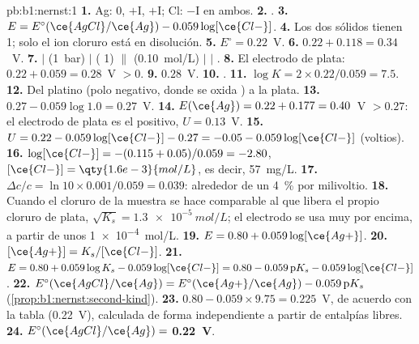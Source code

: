 \begin{solution}{pb:b1:nernst:1}
\textbf{1.} Ag: 0, $+$I, $+$I; Cl: $-$I en ambos.
\textbf{2.} .
\textbf{3.} $E = E^\circ(\ce{AgCl}/\ce{Ag}) - 0.059\log[\ce{Cl-}]$.
\textbf{4.} Los dos sólidos tienen  1; solo el ion cloruro está
en disolución.
\textbf{5.} $E^\circ = 0.22$~V.
\textbf{6.} $0.22 + 0.118 = 0.34$~V.
\textbf{7.}  $|$  (\qty{1}{bar}) $|$  ( 1)
$\|$  (\qty{0.10}{mol/L}) $|$  $|$ .
\textbf{8.} El electrodo de plata: $0.22 + 0.059 = 0.28$~V $> 0$.
\textbf{9.} $0.28$~V.
\textbf{10.} .
\textbf{11.} $\log K = 2 \times 0.22/0.059 = 7.5$.
\textbf{12.} Del platino (polo negativo, donde se oxida ) a la
plata.
\textbf{13.} $0.27 - 0.059\log 1.0 = 0.27$~V.
\textbf{14.} $E(\ce{Ag}) = 0.22 + 0.177 = 0.40$~V $> 0.27$: el electrodo de
plata es el positivo, $U = 0.13$~V.
\textbf{15.} $U = 0.22 - 0.059\log[\ce{Cl-}] - 0.27 = -0.05 -
0.059\log[\ce{Cl-}]$ (voltios).
\textbf{16.} $\log[\ce{Cl-}] = -(0.115 + 0.05)/0.059 = -2.80$,
$[\ce{Cl-}] = \qty{1.6e-3}{mol/L}$, es decir, \qty{57}{mg/L}.
\textbf{17.} $\Delta c/c = \ln 10 \times 0.001/0.059 = 0.039$: alrededor
de un \qty{4}{\percent} por milivoltio.
\textbf{18.} Cuando el cloruro de la muestra se hace comparable al que
libera el propio cloruro de plata, $\sqrt{K_s} = \qty{1.3e-5}{mol/L}$; el
electrodo se usa muy por encima, a partir de unos \qty{1e-4}{mol/L}.
\textbf{19.} $E = 0.80 + 0.059\log[\ce{Ag+}]$.
\textbf{20.} $[\ce{Ag+}] = K_s/[\ce{Cl-}]$.
\textbf{21.} $E = 0.80 + 0.059\log K_s - 0.059\log[\ce{Cl-}] = 0.80 -
0.059\,\mathrm{p}K_s - 0.059\log[\ce{Cl-}]$.
\textbf{22.} $E^\circ(\ce{AgCl}/\ce{Ag}) = E^\circ(\ce{Ag+}/\ce{Ag}) -
0.059\,\mathrm{p}K_s$ (\cref{prop:b1:nernst:second-kind}).
\textbf{23.} $0.80 - 0.059 \times 9.75 = 0.225$~V, de acuerdo con la
tabla (0.22~V), calculada de forma independiente a partir de entalpías
libres.
\textbf{24.} $E^\circ(\ce{AgCl}/\ce{Ag}) = $ \textbf{0.22~V}.
\end{solution}
